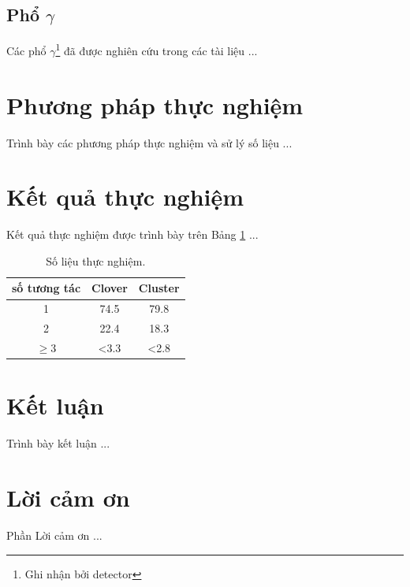 \documentclass[11pt, a4paper, bold, center, twoside, journal]{paper}
\begin{document}
\begin{multicols}{2}%



\subsection{Phổ $\gamma$}
Các phổ $\gamma$\footnote{Ghi nhận bởi detector} đã được nghiên cứu trong các tài liệu \cite{bib_Bazzaco, bib_Simpson, bib_ghinhanbucxa} ...



\section{Phương pháp thực nghiệm}
Trình bày các phương pháp thực nghiệm và sử lý số liệu ...



\section{Kết quả thực nghiệm}
Kết quả thực nghiệm được trình bày trên Bảng \ref{tab:solieu} ...
 
\begin{table}[H]
\centering
	\caption{Số liệu thực nghiệm.}
	\label{tab:solieu} 
	\begin{tabular}{ccc}
	\hline
	số tương tác	& Clover 	& Cluster\\
	\hline
	1	& 74.5 & 79.8\\
	2	& 22.4 & 18.3\\
	$\ge$3	& <3.3 & <2.8\\
	\hline
	\end{tabular}
\end{table}

\section{Kết luận}
Trình bày kết luận ...


\section{Lời cảm ơn}
Phần Lời cảm ơn ...
 




\end{multicols}%
\end{document}

